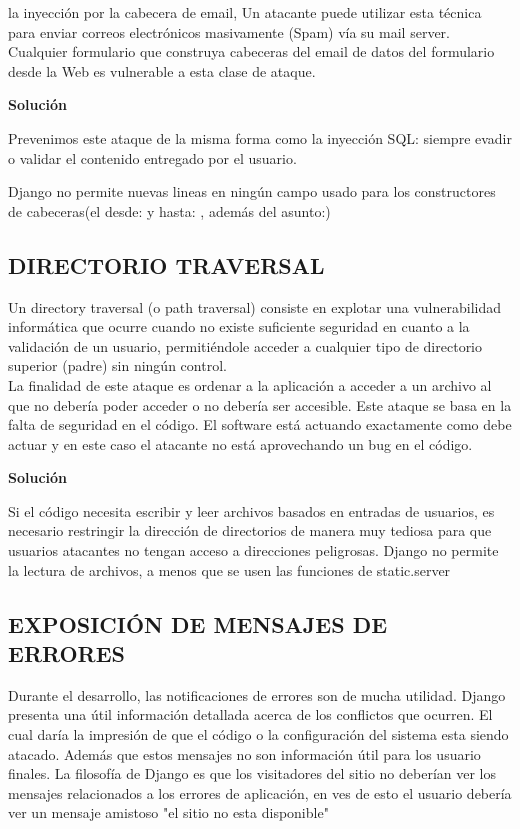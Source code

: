 la inyección por la cabecera de email, Un atacante puede utilizar esta técnica para enviar correos electrónicos masivamente (Spam) vía su mail server. Cualquier formulario que construya cabeceras del email de datos del formulario desde la Web es vulnerable a esta clase de ataque.

\textbf{Solución}

Prevenimos este ataque de la misma forma como la inyección SQL: siempre evadir o validar el contenido entregado por el usuario.

Django no permite nuevas lineas en ningún campo usado para los constructores de cabeceras(el desde: y hasta: , además del asunto:)

\subsection{DIRECTORIO TRAVERSAL}

Un directory traversal (o path traversal) consiste en explotar una vulnerabilidad informática que ocurre cuando no existe suficiente seguridad en cuanto a la validación de un usuario, permitiéndole acceder a cualquier tipo de directorio superior (padre) sin ningún control.\\

La finalidad de este ataque es ordenar a la aplicación a acceder a un archivo al que no debería poder acceder o no debería ser accesible. Este ataque se basa en la falta de seguridad en el código. El software está actuando exactamente como debe actuar y en este caso el atacante no está aprovechando un bug en el código.

\textbf{Solución}

Si el código necesita escribir y leer archivos basados en entradas de usuarios, es necesario restringir la dirección de directorios de manera muy tediosa para que usuarios atacantes no tengan acceso a direcciones peligrosas.
Django no permite la lectura de archivos, a menos que se usen las funciones de static.server

\subsection{EXPOSICIÓN DE MENSAJES DE ERRORES}

Durante el desarrollo, las notificaciones de errores son de mucha utilidad. Django presenta una útil información detallada acerca de los conflictos que ocurren.
El cual daría la impresión de que el código o la configuración del sistema esta siendo atacado.
Además que estos mensajes no son información útil para los usuario finales. La filosofía de Django es que los visitadores del sitio no deberían ver los mensajes relacionados a los errores de aplicación, en ves de esto el usuario debería ver un mensaje amistoso "el sitio no esta disponible" 


